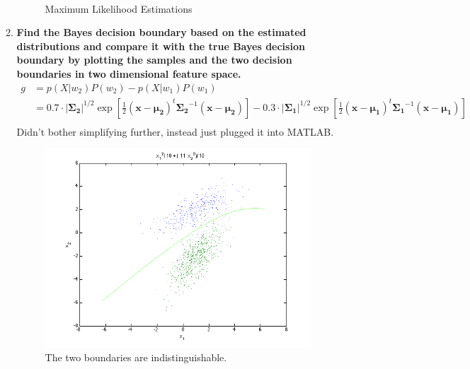 \documentclass[12pt]{article}
\begin{document}
\begin{enumerate}
\begin{enumerate}
\begin{figure}[H]
\begin{equation}
\begin{split}
    \end{split}
    \end{equation}
    \caption{Maximum Likelihood Estimations}
    \end{figure}
  \item \textbf{Find the Bayes decision boundary based on the estimated distributions and compare it with the true Bayes decision boundary by plotting the samples and the two decision boundaries in two dimensional feature space.}
    \begin{equation}
    \begin{split}
      g& = p(X|w_2)P(w_2) - p(X|w_1)P(w_1) \\
      & = 0.7\cdot|\boldsymbol{\Sigma_2}|^{1/2} \exp\left[\frac{1}{2}(\mathbf{x}-\boldsymbol{\mu_2})^t\boldsymbol{\Sigma_2}^{-1}(\mathbf{x}-\boldsymbol{\mu_2})\right] -
 0.3\cdot|\boldsymbol{\Sigma_1}|^{1/2} \exp\left[\frac{1}{2}(\mathbf{x}-\boldsymbol{\mu_1})^t\boldsymbol{\Sigma_1}^{-1}(\mathbf{x}-\boldsymbol{\mu_1})\right] \\
    \end{split}
    \end{equation}
  Didn't bother simplifying further, instead just plugged it into MATLAB.
    \begin{figure}[H]
      \includegraphics{2b}
      \caption{The two boundaries are indistinguishable.}
    \end{figure}
  \end{enumerate}
\end{enumerate}
\end{document}
